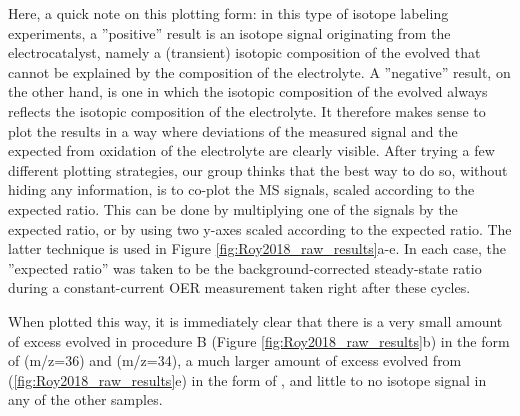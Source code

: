 Here, a quick note on this plotting form: in this type of isotope labeling experiments, a ''positive'' result is an isotope signal originating from the electrocatalyst, namely a (transient) isotopic composition of the evolved  that cannot be explained by the composition of the electrolyte. A ''negative'' result, on the other hand, is one in which the isotopic composition of the evolved  always reflects the isotopic composition of the electrolyte. It therefore makes sense to plot the results in a way where deviations of the measured  signal and the expected  from oxidation of the electrolyte are clearly visible. After trying a few different plotting strategies, our group thinks that the best way to do so, without hiding any information, is to co-plot the MS signals, scaled according to the expected ratio. This can be done by multiplying one of the signals by the expected ratio, or by using two y-axes scaled according to the expected ratio. The latter technique is used in Figure \ref{fig:Roy2018_raw_results}a-e. In each case, the ''expected ratio'' was taken to be the background-corrected steady-state ratio during a constant-current OER measurement taken right after these cycles.

When plotted this way, it is immediately clear that there is a very small amount of excess  evolved in procedure B (Figure \ref{fig:Roy2018_raw_results}b) in the form of  (m/z=36) and  (m/z=34), a much larger amount of excess  evolved from  (\ref{fig:Roy2018_raw_results}e) in the form of , and little to no isotope signal in any of the other samples.

